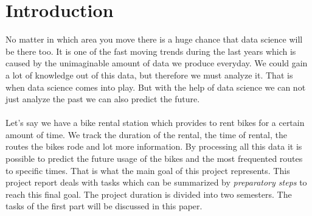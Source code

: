 
\section{Introduction}

No matter in which area you move there is a huge chance that data science will be there too. It is one of the fast moving trends during the last years which is caused by the unimaginable amount of data we produce everyday. We could gain a lot of knowledge out of this data, but therefore we must analyze it. That is when data science comes into play. But with the help of data science we can not just analyze the past we can also predict the future.\\\\
Let's say we have a bike rental station which provides to rent bikes for a certain amount of time. We track the duration of the rental, the time of rental, the routes the bikes rode and lot more information. By processing all this data it is possible to predict the future usage of the bikes and the most frequented routes to specific times.
That is what the main goal of this project represents. This project report deals with tasks which can be summarized by \emph{preparatory steps} to reach this final goal. The project duration is divided into two semesters. The tasks of the first part will be discussed in this paper.

